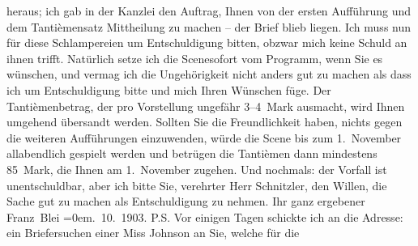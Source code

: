 \begin{ledgroupsized}[t]{13cm}
               heraus; ich gab in der Kanzlei den Auftrag, Ihnen von der ersten Aufführung und dem
               Tantièmensatz Mittheilung zu machen – der Brief blieb liegen. Ich muss nun für diese
               Schlampereien um Entschuldigung bitten, obzwar mich keine Schuld an ihnen trifft.
               Natürlich setze ich die Scenesofort vom Programm, wenn Sie es wünschen, und
               vermag ich die Ungehörigkeit {\pb}nicht anders gut zu machen als
               dass ich um Entschuldigung bitte und mich Ihren Wünschen füge. Der Tantièmenbetrag,
               der pro Vorstellung ungefähr 3–4 Mark ausmacht, wird Ihnen umgehend übersandt werden.
               Sollten Sie die Freundlichkeit \introOben{}haben\introOben{}, nichts gegen die
               weiteren Aufführungen einzuwenden, würde die Scene bis zum 1. November allabendlich
               gespielt werden und betrügen die Tantièmen dann mindestens 85 Mark, die Ihnen am
                  1. November zugehen.\pend
           \pstart
           Und nochmals: der Vorfall ist unentschuldbar, aber ich bitte Sie, verehrter Herr
               Schnitzler, den Willen, die Sache gut zu machen als Entschuldigung zu nehmen.\pend
           \pstart
           Ihr ganz ergebener{\\[\baselineskip]}\spacefill\mbox{Franz Blei}\pend
           \leftskip=0em{}. 10. 1903.\pend
           \pstart
           P.S. Vor einigen Tagen schickte ich an die Adresse: \label{K_L01329-1v}\label{K_L01329-1h} ein Briefersuchen
                  einer Miss Johnson an Sie, welche für die

\end{ledgroupsized}
